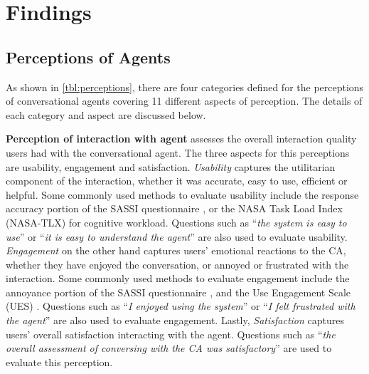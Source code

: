 
\section{Findings}

\subsection{Perceptions of Agents}

As shown in \autoref{tbl:perceptions}, there are four categories defined for the perceptions of conversational agents covering 11 different aspects of perception. The details of each category and aspect are discussed below.

\textbf{Perception of interaction with agent} assesses the overall interaction quality users had with the conversational agent. The three aspects for this perceptions are usability, engagement and satisfaction. \textit{Usability} captures the utilitarian component of the interaction, whether it was accurate, easy to use, efficient or helpful. Some commonly used methods to evaluate usability include the response accuracy portion of the SASSI questionnaire \cite{hone2000towards}, or the NASA Task Load Index (NASA-TLX) \cite{hart1988development} for cognitive workload. Questions such as ``\textit{the system is easy to use}'' or ``\textit{it is easy to understand the agent}'' are also used to evaluate usability. \textit{Engagement} on the other hand captures users' emotional reactions to the CA, whether they have enjoyed the conversation, or annoyed or frustrated with the interaction. Some commonly used methods to evaluate engagement include the annoyance portion of the SASSI questionnaire \cite{hone2000towards}, and the Use Engagement Scale (UES) \cite{o2018practical}. Questions such as ``\textit{I enjoyed using the system}'' or ``\textit{I felt frustrated with the agent}'' are also used to evaluate engagement. Lastly, \textit{Satisfaction} captures users' overall satisfaction interacting with the agent. Questions such as ``\textit{the overall assessment of conversing with the CA was satisfactory}'' are used to evaluate this perception.

